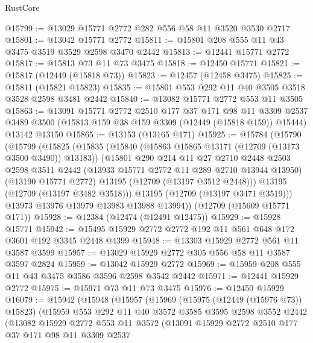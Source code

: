 \begin{lexlean}{RustCore}
\begin{coremodule}
@15799 := @13029 @15771 @2772 @282 @556 @58 @11 @3520 @3530 @2717
@15801 := @13042 @15771 @2772
@15811 := @15801 @208 @555 @11 @43 @3475 @3519 @3529 @2598 @3470 @2442
@15813 := @12441 @15771 @2772
@15817 := @15813 @73 @11 @73 @3475
@15818 := @12450 @15771
@15821 := @15817 (@12449 (@15818 @73))
@15823 := @12457 (@12458 @3475)
@15825 := @15811 (@15821 @15823)
@15835 := @15801 @553 @292 @11 @40 @3505 @3518 @3528 @2598 @3481 @2442
@15840 := @13082 @15771 @2772 @553 @11 @3505
@15863 := @13091
    @15771
    @2772
    @2510
    @177
    @37
    @171
    @98
    @11
    @3309
    @2537
    @3489
    @3500
    (@15813 @159 @38 @159 @3309 (@12449 (@15818 @159)) @15444)
    @13142
    @13150
@15865 := @13153 (@13165 @171)
@15925 := @15784
    (@15790
      (@15799
        (@15825
          (@15835
            (@15840 (@15863 @15865 @13171 (@12709 (@13173 @3500 @3490)) @13183))
            (@15801
              @290
              @214
              @11
              @27
              @2710
              @2448
              @2503
              @2598
              @3511
              @2442
              (@13933 @15771 @2772 @11 @289 @2710 @13944 @13950)
              (@13190 @15771 @2772)
              @13195
              (@12709 (@13197 @3512 @2448)))
            @13195
            (@12709 (@13197 @3482 @3518)))
          @13195
          (@12709 (@13197 @3471 @3519)))
        @13973
        @13976
        @13979
        @13983
        @13988
        @13994))
    (@12709 (@15609 @15771 @171))
@15928 := @12384 (@12474 (@12491 @12475))
@15929 := @15928 @15771
@15942 := @15495 @15929 @2772 @2772 @192 @11 @561 @648 @172 @3601 @192 @3345 @2448 @4399
@15948 := @13303 @15929 @2772 @561 @11 @3587 @3599
@15957 := @13029 @15929 @2772 @305 @556 @58 @11 @3587 @3597 @2824
@15959 := @13042 @15929 @2772
@15969 := @15959 @208 @555 @11 @43 @3475 @3586 @3596 @2598 @3542 @2442
@15971 := @12441 @15929 @2772
@15975 := @15971 @73 @11 @73 @3475
@15976 := @12450 @15929
@16079 := @15942
    (@15948
      (@15957
        (@15969
          (@15975 (@12449 (@15976 @73)) @15823)
          (@15959
            @553
            @292
            @11
            @40
            @3572
            @3585
            @3595
            @2598
            @3552
            @2442
            (@13082
              @15929
              @2772
              @553
              @11
              @3572
              (@13091
                @15929
                @2772
                @2510
                @177
                @37
                @171
                @98
                @11
                @3309
                @2537

\end{coremodule}
\end{lexlean}

